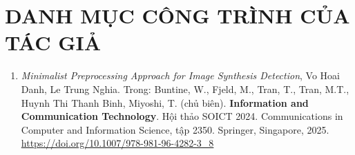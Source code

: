 \chapter*{DANH MỤC CÔNG TRÌNH CỦA TÁC GIẢ}
\label{publish}

\begin{enumerate}
    \item \textit{Minimalist Preprocessing Approach for Image Synthesis Detection}, Vo Hoai Danh, Le Trung Nghia. Trong: Buntine, W., Fjeld, M., Tran, T., Tran, M.T., Huynh Thi Thanh Binh, Miyoshi, T. (chủ biên). \textbf{Information and Communication Technology}. Hội thảo SOICT 2024. Communications in Computer and Information Science, tập 2350. Springer, Singapore, 2025. \url{https://doi.org/10.1007/978-981-96-4282-3_8}
\end{enumerate}